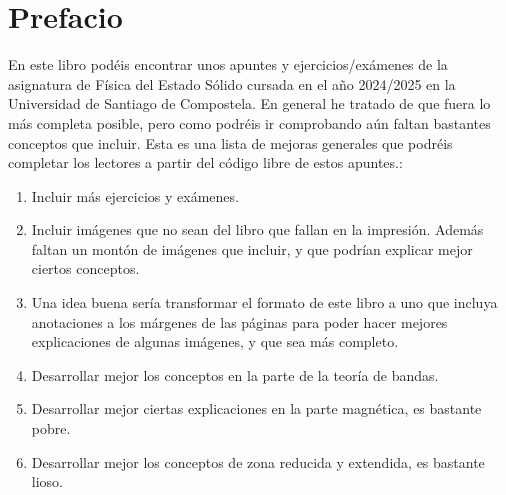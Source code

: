\section*{Prefacio}
En este libro podéis encontrar unos apuntes y ejercicios/exámenes de la asignatura de Física del Estado Sólido cursada en el año 2024/2025 en la Universidad de Santiago de Compostela. En general he tratado de que fuera lo más completa posible, pero como podréis ir comprobando aún faltan bastantes conceptos que incluir. Esta es una lista de mejoras generales que podréis completar los lectores a partir del código libre de estos apuntes.:

\begin{enumerate}
	\item Incluir más ejercicios y exámenes.
	\item Incluir imágenes que no sean del libro que fallan en la impresión. Además faltan un montón de imágenes que incluir, y que podrían explicar mejor ciertos conceptos.
	\item Una idea buena sería transformar el formato de este libro a uno que incluya anotaciones a los márgenes de las páginas para poder hacer mejores explicaciones de algunas imágenes, y que sea más completo.
	\item Desarrollar mejor los conceptos en la parte de la teoría de bandas.
	\item Desarrollar mejor ciertas explicaciones en la parte magnética, es bastante pobre.
	\item Desarrollar mejor los conceptos de zona reducida y extendida, es bastante lioso.
\end{enumerate}